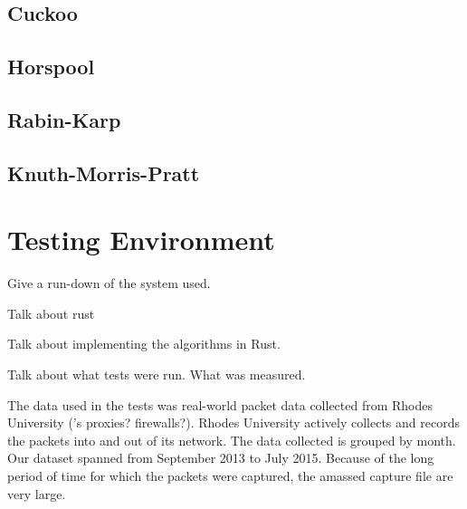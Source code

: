 \documentclass{article}
\begin{document}
\subsection{Cuckoo}
\cite{Fan2014}
\subsection{Horspool}
\cite{Horspool1980}
\subsection{Rabin-Karp}
\cite{Karp1987}
\subsection{Knuth-Morris-Pratt}
\cite{Knuth1977}

\section{Testing Environment}	
Give a run-down of the system used.

Talk about rust

Talk about implementing the algorithms in Rust.

Talk about what tests were run. What was measured.

The data used in the tests was real-world packet data collected from Rhodes University ('s proxies? firewalls?). Rhodes University actively collects and records the packets into and out of its network. The data collected is grouped by month. Our dataset spanned from September 2013 to July 2015. Because of the long period of time for which the packets were captured, the amassed capture file are very large.

\begin{comment}
 To get the size of each file:
    $ find . -name '*.cap' | xargs du -h
 To get the number of packets in each file:
    $ find . -name '*.pcap' | xargs wc
 The previous one may be incorrect.
\end{comment}
\end{document}
